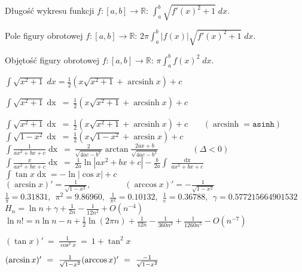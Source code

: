 
\usepackage[utf8]{inputenc}
\usepackage{polski}
\usepackage{amsfonts}
\usepackage{amsmath}
\DeclareMathOperator{\arcsinh}{arcsinh}
\DeclareMathOperator{\dx}{ dx}


Długość wykresu funkcji $f : [a, b] \to \mathbb{R}$:
  \hfill
  $\int_a^b \sqrt{f'(x)^2 + 1} \; dx$.

Pole figury obrotowej $f : [a, b] \to \mathbb{R}$:
  \hfill
  $2 \pi \int_a^b |f(x)| \sqrt{f'(x)^2 + 1} \; dx$.

Objętość figury obrotowej $f : [a, b] \to \mathbb{R}$:
  \hfill
  $\pi \int_a^b f(x)^2 \; dx$.

$\int \sqrt{x^2 + 1} \; dx = \frac12 \left( x\sqrt{x^2 + 1} + \arcsinh x  \right) + c$

$\int \sqrt{x^2 + 1} \dx\ =\ \frac12 \left( x\sqrt{x^2 + 1} + \arcsinh x \right) + c$

 \( \int \sqrt{x^2 + 1} \dx\ =\ \frac12 \left( x\sqrt{x^2 + 1} + \arcsinh x \right) + c\) 
  \ \ \ $(\arcsinh = \mathtt{asinh})$ \\
  \( \int \sqrt{1 - x^2} \dx\ =\ \frac12 \left( x\sqrt{1 - x^2} + \arcsin x \right) + c\) \\
  \( \int \frac{1}{ax^2 + bx + c} \dx\ =\ \frac{2}{\sqrt{4ac - b^2}} \arctan
      \frac{2ax + b}{\sqrt{4ac - b^2}} \qquad \qquad (\Delta < 0)\) \\
  \( \int \frac{x}{ax^2 + bx + c} \dx\ =\ \frac{1}{2a} \ln |ax^2 + bx + c|
      - \frac{b}{2a} \int \frac{\dx}{ax^2 + bx + c} \) \\
  \( \int \tan x \dx = - \ln |\cos x| + c \) \\
  \( (\arcsin x)' = \frac{1}{\sqrt{1 - x^2}}, \qquad \qquad
     (\arccos x)' = -\frac{1}{\sqrt{1 - x^2}} \) \\
  \( \frac1{\pi} = 0.31831,\ \ \pi^2 = 9.86960,\ \ \frac1{\pi^2} = 0.10132,\ \ \frac1e = 0.36788,
  \ \ \gamma = 0.577215664901532\) \\
  \( H_n = \ln n + \gamma + \frac1{2n} - \frac1{12n^2} + O(n^{-4}) \) \\
  \( \ln n! = n \ln n - n + \frac12 \ln(2 \pi n) + \frac1{12n} - \frac1{360n^3} + \frac1{1260n^5}
  - O(n^{-7}) \)

$(\tan x)'\ =\ \frac{1}{\cos^2 x}\ =\ 1 + \tan^2 x$

$(\arcsin x)'\ =\ \frac{1}{\sqrt{1-x^2}} \hfill
	(\arccos x)'\ =\ \frac{-1}{\sqrt{1-x^2}}$

